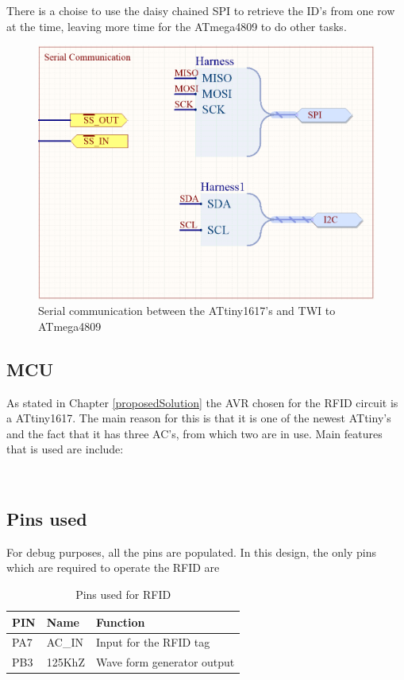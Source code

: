 There is a choise to use the daisy chained SPI to retrieve the ID's from one row at the time, leaving more time for the ATmega4809 to do other tasks.

\begin{figure}[H]
    \centering
    \includegraphics[width=\textwidth]{05_My_Implementation/figures/Serial.png}
    \caption{Serial communication between the ATtiny1617's and TWI to ATmega4809}
    \label{fig:my_label}
\end{figure}

\subsection{MCU}


As stated in Chapter \ref{proposedSolution} the AVR chosen for the RFID circuit is a ATtiny1617\cite{attiny1617}. The main reason for this is that it is one of the newest ATtiny's and the fact that it has three AC's, from which two are in use. Main features that is used are include:


\


\subsection{Pins used}
For debug purposes, all the pins are populated. In this design, the only pins which are required to operate the RFID are 
\begin{table}[H]
\centering
\caption{Pins used for RFID}
\label{tab:RFID_pins}
\begin{tabular}{lll}
\hline
PIN & Name   & Function                   \\
\hline
PA7 & AC\_IN & Input for the RFID tag     \\
PB3 & 125KhZ & Wave form generator output \\
\hline
\end{tabular}
\end{table}

